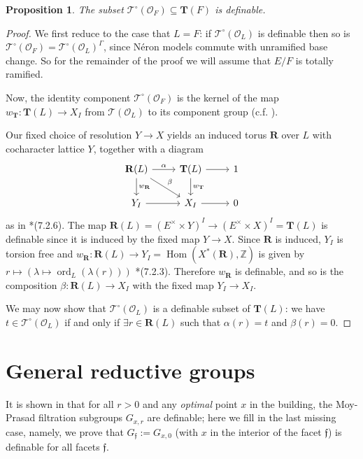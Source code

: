 \documentclass{amsart}
\newcommand{\Z}{{\mathbb Z}}
\newcommand{\ri}{\mathcal{O}}
\newcommand{\bT}{\mathbf {T}}
\newcommand{\bR}{\mathbf{R}}
\newcommand{\ff}{{\mathfrak f}}
\newcommand{\Ner}[1]{\mathcal{#1}}
\newcommand{\NerC}[1]{\mathcal{#1}^\circ}
\DeclareMathOperator{\ord}{ord}
\DeclareMathOperator{\Hom}{Hom}
\theoremstyle{plain}
\newtheorem{prop}[thm]{Proposition}
\theoremstyle{definition}
\begin{document}
\begin{prop} \label{prop:NerCdefinable}
The subset $\NerC{T}(\ri_F) \subseteq \bT(F)$ is definable.
\end{prop}
\begin{proof}
We first reduce to the case that $L = F$: if $\NerC{T}(\ri_L)$ is definable then so is $\NerC{T}(\ri_F) = \NerC{T}(\ri_L)^\Gamma$, since N\'eron models commute with unramified base change.  So for the remainder of the proof we will assume that $E/F$ is totally ramified.

Now, the identity component $\NerC{T}(\ri_F)$ is the kernel of the map $w_\bT : \bT(L) \to X_I$ from $\Ner{T}(\ri_L)$ to its component group (c.f. ).

Our fixed choice of resolution $Y \to X$ yields an induced torus $\bR$ over $L$ with cocharacter lattice $Y$, together with a diagram
\[
\begin{tikzcd}
\bR(L) \rar{\alpha} \dar{w_{\bR}} \drar{\beta} & \bT(L) \rar \dar{w_{\bT}} & 1 \\
Y_I \rar & X_I \rar & 0
\end{tikzcd}
\]
as in \cite{kottwitz:isocrystals-2}*{(7.2.6)}.  The map $\bR(L) = (E^\times \times Y)^I \to (E^\times \times X)^I = \bT(L)$
is definable since it is induced by the fixed map $Y \to X$.  Since $\bR$ is induced,
$Y_I$ is torsion free and $w_\bR : \bR(L) \to Y_I = \Hom(X^\ast(\bR), \Z)$ is given by
$r \mapsto \left(\lambda \mapsto \ord_{L}(\lambda(r))\right)$ \cite{kottwitz:isocrystals-2}*{(7.2.3)}.
Therefore $w_\bR$ is definable, and so is the composition $\beta : \bR(L) \to X_I$ with the fixed map $Y_I \to X_I$.

We may now show that $\NerC{T}(\ri_L)$ is a definable subset of $\bT(L)$: we have $t \in \NerC{T}(\ri_L)$ if and only if $\exists r \in \bR(L)$ such that $\alpha(r) = t$ and $\beta(r) = 0$.
\end{proof}

\section{General reductive groups}
It is shown in \cite{CGH-2} that for all $r>0$ and any \emph{optimal} point $x$ in the building, the Moy-Prasad filtration subgroups $G_{x, r}$ are definable; here we fill in the last missing case, namely, we prove that $G_{\ff}:=G_{x, 0}$ (with $x$ in the interior of the facet $\ff$)   is definable for  all facets $\ff$.  
\end{document}
